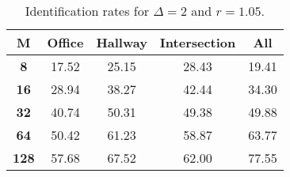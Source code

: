 \begin{table}[h]
    \footnotesize
    \centering
    \begin{tabular}{|c|c|c|c|l|}    
    \hline
    {\bf M} & {\bf Office} & {\bf Hallway} & {\bf Intersection} &     \multicolumn{1}{c|}{{\bf All}} \\ \hline
    {\bf 8} & 17.52 & 25.15 & 28.43 & 19.41 \\ \hline
    {\bf 16} & 28.94 & 38.27 & 42.44 & 34.30 \\ \hline
    {\bf 32} & 40.74 & 50.31 & 49.38 & 49.88 \\ \hline
    {\bf 64} & 50.42 & 61.23 & 58.87 & 63.77 \\ \hline
    {\bf 128} & 57.68 & 67.52 & 62.00 & 77.55 \\ \hline
    \end{tabular}
    \caption{Identification rates for $\Delta = 2$ and $r = 1.05$.}    
    \label{tab:identify_speakers_1.05_mit_19_2}
\end{table}
